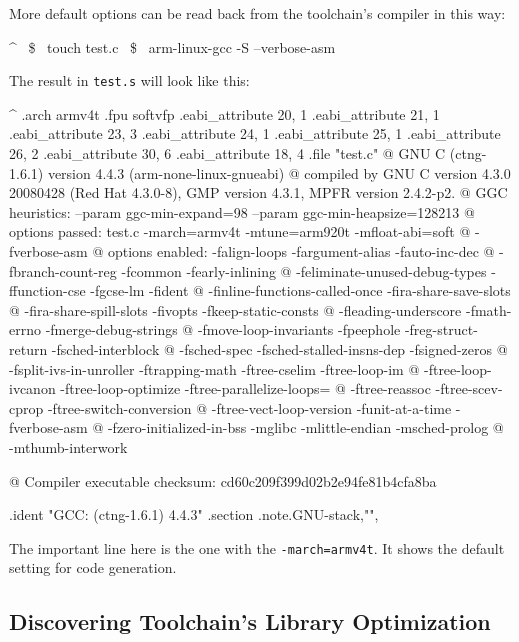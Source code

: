 More default options can be read back from the toolchain's compiler in this way:

\begin{ptxshell}[escapechar=~]{^}
~\$~ touch test.c
~\$~ arm-linux-gcc -S --verbose-asm
\end{ptxshell}

The result in \texttt{test.s} will look like this:

\begin{ptxshell}[escapechar=~]{^}
   .arch armv4t
   .fpu softvfp
   .eabi_attribute 20, 1
   .eabi_attribute 21, 1
   .eabi_attribute 23, 3
   .eabi_attribute 24, 1
   .eabi_attribute 25, 1
   .eabi_attribute 26, 2
   .eabi_attribute 30, 6
   .eabi_attribute 18, 4
   .file "test.c"
@ GNU C (ctng-1.6.1) version 4.4.3 (arm-none-linux-gnueabi)
@  compiled by GNU C version 4.3.0 20080428 (Red Hat 4.3.0-8), GMP version 4.3.1, MPFR version 2.4.2-p2.
@ GGC heuristics: --param ggc-min-expand=98 --param ggc-min-heapsize=128213
@ options passed:  test.c -march=armv4t -mtune=arm920t -mfloat-abi=soft
@ -fverbose-asm
@ options enabled:  -falign-loops -fargument-alias -fauto-inc-dec
@ -fbranch-count-reg -fcommon -fearly-inlining
@ -feliminate-unused-debug-types -ffunction-cse -fgcse-lm -fident
@ -finline-functions-called-once -fira-share-save-slots
@ -fira-share-spill-slots -fivopts -fkeep-static-consts
@ -fleading-underscore -fmath-errno -fmerge-debug-strings
@ -fmove-loop-invariants -fpeephole -freg-struct-return -fsched-interblock
@ -fsched-spec -fsched-stalled-insns-dep -fsigned-zeros
@ -fsplit-ivs-in-unroller -ftrapping-math -ftree-cselim -ftree-loop-im
@ -ftree-loop-ivcanon -ftree-loop-optimize -ftree-parallelize-loops=
@ -ftree-reassoc -ftree-scev-cprop -ftree-switch-conversion
@ -ftree-vect-loop-version -funit-at-a-time -fverbose-asm
@ -fzero-initialized-in-bss -mglibc -mlittle-endian -msched-prolog
@ -mthumb-interwork

@ Compiler executable checksum: cd60c209f399d02b2e94fe81b4cfa8ba

   .ident   "GCC: (ctng-1.6.1) 4.4.3"
   .section .note.GNU-stack,"",%
\end{ptxshell}

The important line here is the one with the \texttt{-march=armv4t}. It shows
the default setting for code generation.

\subsection{Discovering Toolchain's Library Optimization}


